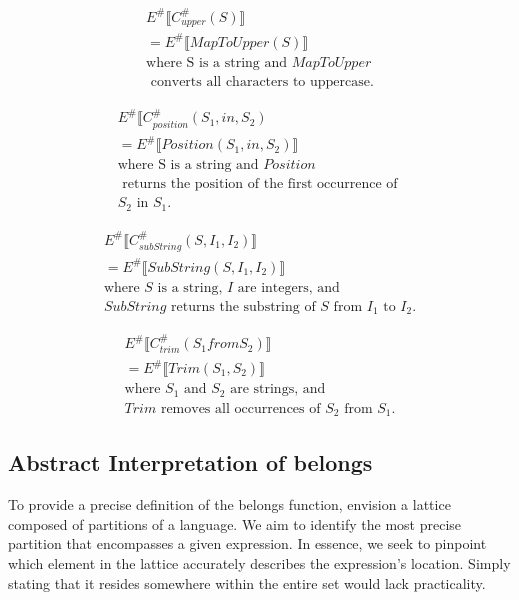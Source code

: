 \begin{align*}
    E^\# \llbracket C_{upper}^\# (S) \rrbracket \\
    = E^\# \llbracket MapToUpper (S) \rrbracket \\
    \text{where S is a string and } MapToUpper \\
    \text{ converts all characters to uppercase.}
\end{align*}

\begin{align*}
    E^\# \llbracket C_{position}^\# (S_1, in, S_2) \\
    = E^\# \llbracket Position(S_1, in, S_2) \rrbracket \\
    \text{where S is a string and } Position \\
    \text{ returns the position of the first occurrence of } \\
    S_2 \text{ in } S_1.
\end{align*}

\begin{align*}
    E^\# \llbracket C_{subString}^\# (S, I_1, I_2) \rrbracket \\
    = E^\# \llbracket SubString(S, I_1, I_2) \rrbracket \\
    \text{where } S \text{ is a string, } I \text{ are integers, and } \\
    SubString \text{ returns the substring of } S \text{ from } I_1 \text{ to } I_2.
\end{align*}

\begin{align*}
    E^\# \llbracket C_{trim}^\# (S_1 from S_2) \rrbracket \\
    = E^\# \llbracket Trim(S_1, S_2) \rrbracket \\
    \text{where } S_1 \text{ and } S_2 \text{ are strings, and }\\
    Trim \text{ removes all occurrences of } S_2 \text{ from } S_1.
\end{align*}


\subsection{Abstract Interpretation of belongs}
To provide a precise definition of the belongs function, envision a lattice composed of partitions of a language. We aim to identify the most precise partition that encompasses a given expression. In essence, we seek to pinpoint which element in the lattice accurately describes the expression's location. Simply stating that it resides somewhere within the entire set would lack practicality.


